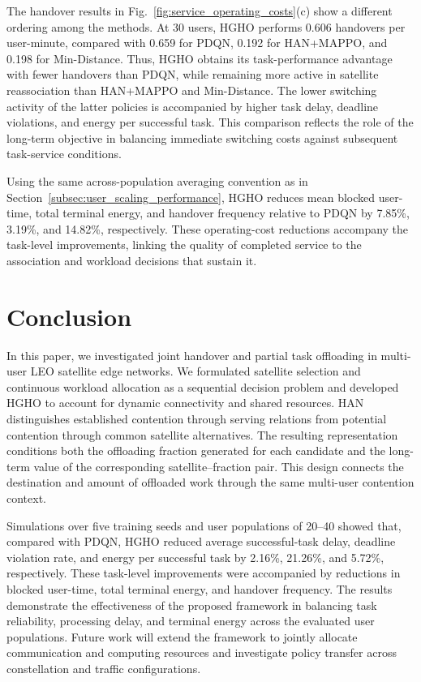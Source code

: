 \documentclass[journal]{IEEEtran}
\begin{document}
The handover results in
Fig.~\ref{fig:service_operating_costs}(c) show a
different ordering among the methods.
At 30 users, HGHO performs 0.606 handovers per
user-minute, compared with 0.659 for PDQN,
0.192 for HAN+MAPPO, and 0.198 for Min-Distance.
Thus, HGHO obtains its task-performance advantage
with fewer handovers than PDQN, while remaining more
active in satellite reassociation than HAN+MAPPO
and Min-Distance.
The lower switching activity of the latter policies
is accompanied by higher task delay, deadline violations,
and energy per successful task.
This comparison reflects the role of the long-term
objective in balancing immediate switching costs
against subsequent task-service conditions.

Using the same across-population averaging convention
as in Section~\ref{subsec:user_scaling_performance},
HGHO reduces mean blocked user-time,
total terminal energy, and handover frequency relative
to PDQN by 7.85\%, 3.19\%, and 14.82\%, respectively.
These operating-cost reductions accompany the
task-level improvements, linking the quality of
completed service to the association and workload
decisions that sustain it.

\FloatBarrier

\section{Conclusion}
\label{sec:conclusion}

In this paper, we investigated joint handover and partial
task offloading in multi-user LEO satellite edge networks.
We formulated satellite selection and continuous workload
allocation as a sequential decision problem and developed
HGHO to account for dynamic connectivity and shared
resources. HAN distinguishes established contention through
serving relations from potential contention through common
satellite alternatives. The resulting representation conditions
both the offloading fraction generated for each candidate
and the long-term value of the corresponding satellite--fraction
pair. This design connects the destination and amount of
offloaded work through the same multi-user contention context.

Simulations over five training seeds and user populations
of 20--40 showed that, compared with PDQN, HGHO
reduced average successful-task delay, deadline violation
rate, and energy per successful task by 2.16\%, 21.26\%,
and 5.72\%, respectively. These task-level improvements
were accompanied by reductions in blocked user-time,
total terminal energy, and handover frequency. The results
demonstrate the effectiveness of the proposed framework
in balancing task reliability, processing delay, and terminal
energy across the evaluated user populations. Future work
will extend the framework to jointly allocate communication
and computing resources and investigate policy transfer
across constellation and traffic configurations.



\end{document}
